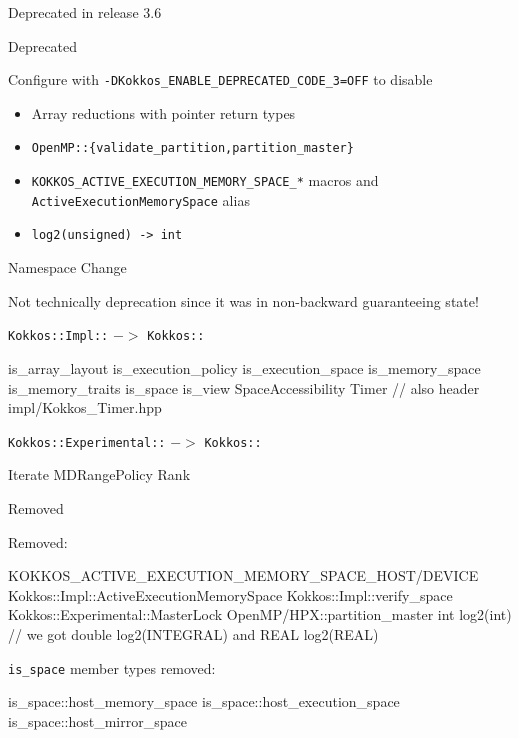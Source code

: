 

\begin{frame}[fragile]

        {\Huge Deprecated in release 3.6}

  \vspace{-20pt}

\end{frame}


\begin{frame}[fragile]{Deprecated}

Configure with \texttt{-DKokkos\_ENABLE\_DEPRECATED\_CODE\_3=OFF} to disable   

\begin{itemize}
\item Array reductions with pointer return types
\item \texttt{OpenMP::\{validate\_partition,partition\_master\}}
\item \texttt{KOKKOS\_ACTIVE\_EXECUTION\_MEMORY\_SPACE\_*} macros and \texttt{ActiveExecutionMemorySpace} alias
\item \texttt{log2(unsigned) -> int}
\end{itemize}

\end{frame}

\begin{frame}[fragile]{Namespace Change}
\begin{center}
Not technically deprecation since it was in non-backward guaranteeing state!
\end{center}
\texttt{Kokkos::Impl::} $->$ \texttt{Kokkos::}
\begin{code}	
    is_array_layout
    is_execution_policy
    is_execution_space
    is_memory_space
    is_memory_traits
    is_space
    is_view
    SpaceAccessibility
    Timer  // also header impl/Kokkos_Timer.hpp
\end{code}


\texttt{Kokkos::Experimental::} $->$ \texttt{Kokkos::}
\begin{code}
    Iterate
    MDRangePolicy
    Rank
\end{code}
\end{frame}


\begin{frame}[fragile]{Removed}

Removed:

\begin{code}
    KOKKOS_ACTIVE_EXECUTION_MEMORY_SPACE_HOST/DEVICE
    Kokkos::Impl::ActiveExecutionMemorySpace
    Kokkos::Impl::verify_space
    Kokkos::Experimental::MasterLock
    OpenMP/HPX::partition_master
    int log2(int) // we got double log2(INTEGRAL) and REAL log2(REAL)
\end{code}

\texttt{is\_space} member types removed:
\begin{code}
    is_space::host_memory_space
    is_space::host_execution_space
    is_space::host_mirror_space
\end{code}
\end{frame}


